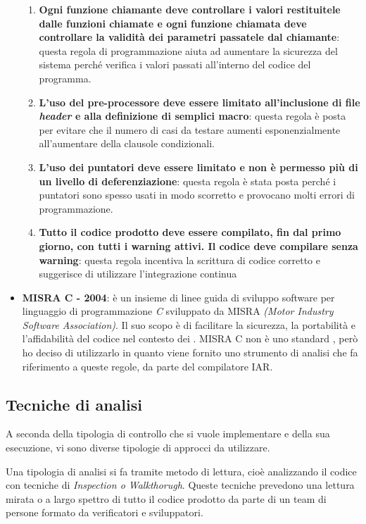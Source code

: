 \begin{itemize}
\begin{enumerate}
\item \textbf{Ogni funzione chiamante deve controllare i valori restituitele dalle funzioni chiamate e ogni funzione chiamata deve controllare la validità dei parametri passatele dal chiamante}: questa regola di programmazione aiuta ad aumentare la sicurezza del sistema perché verifica i valori passati all'interno del codice del programma.

\item \textbf{L'uso del pre-processore deve essere limitato all'inclusione di file \textit{header} e alla definizione di semplici macro}: questa regola è posta per evitare che il numero di casi da testare aumenti esponenzialmente all'aumentare della clausole condizionali.

\item \textbf{L'uso dei puntatori deve essere limitato e non è permesso più di un livello di deferenziazione}: questa regola è stata posta perché i puntatori sono spesso usati in modo scorretto e provocano molti errori di programmazione.

\item \textbf{Tutto il codice prodotto deve essere compilato, fin dal primo giorno, con tutti i warning attivi. Il codice deve compilare senza warning}: questa regola incentiva la scrittura di codice corretto e suggerisce di utilizzare l'integrazione continua
\end{enumerate} 

\item[] \textbf{MISRA C - 2004}: è un insieme di linee guida di sviluppo software per linguaggio di programmazione \textit{C} sviluppato da MISRA \textit{(Motor Industry Software Association)}. Il suo scopo è di facilitare la sicurezza, la portabilità e l'affidabilità del codice nel contesto dei .
MISRA C non è uno standard , però ho deciso di utilizzarlo in quanto viene fornito uno strumento di analisi che fa riferimento a queste regole, da parte del compilatore IAR.
\end{itemize}

\subsection{Tecniche di analisi}
A seconda della tipologia di controllo che si vuole implementare e della sua esecuzione, vi sono diverse tipologie di approcci da utilizzare.

Una tipologia di analisi si fa tramite metodo di lettura, cioè analizzando il codice con tecniche di \textit{Inspection o Walkthorugh}. Queste tecniche prevedono una lettura mirata o a largo spettro di tutto il codice prodotto da parte di un team di persone formato da verificatori e sviluppatori. 

